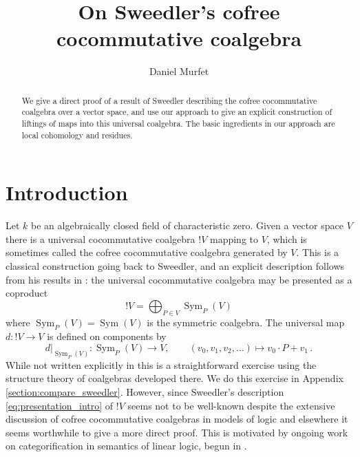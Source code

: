 \documentclass[english,letter paper,12pt,reqno]{article}
\theoremstyle{example}
\numberwithin{equation}{section}
\def\res{\operatorname{Res}}
\DeclareMathOperator{\Sym}{Sym}
\begin{document}
\def\ScoreOverhang{1pt}

\def\Res{\res\!}
\newcommand{\ud}[1]{\operatorname{d}\!{#1}}
\newcommand{\Ress}[1]{\res_{#1}\!}
\newcommand{\cat}[1]{\mathcal{#1}}
\newcommand{\lto}{\longrightarrow}
\newcommand{\xlto}[1]{\stackrel{#1}\lto}
\newcommand{\mf}[1]{\mathfrak{#1}}
\newcommand{\md}[1]{\mathscr{#1}}
\newcommand{\church}[1]{\underline{#1}}
\newcommand{\prf}[1]{\underline{#1}}
\newcommand{\den}[1]{\llbracket #1 \rrbracket}
\def\l{\,|\,}
\def\sgn{\textup{sgn}}
\def\cont{\operatorname{cont}}

\title{On Sweedler's cofree cocommutative coalgebra}
\author{Daniel Murfet}

\maketitle

\begin{abstract} We give a direct proof of a result of Sweedler describing the cofree cocommutative coalgebra over a vector space, and use our approach to give an explicit construction of liftings of maps into this universal coalgebra. The basic ingredients in our approach are local cohomology and residues.
\end{abstract}

\section{Introduction}

Let $k$ be an algebraically closed field of characteristic zero. Given a vector space $V$ there is a universal cocommutative coalgebra ${!}V$ mapping to $V$, which is sometimes called the cofree cocommutative coalgebra generated by $V$. This is a classical construction going back to Sweedler, and an explicit description follows from his results in \cite{sweedler}: the universal cocommutative coalgebra may be presented as a coproduct
\begin{equation}\label{eq:presentation_intro}
{!} V = \bigoplus_{P \in V} \Sym_P(V)
\end{equation}
where $\Sym_P(V) = \Sym(V)$ is the symmetric coalgebra. The universal map $d: {!} V \lto V$ is defined on components by
\[
d|_{\Sym_P(V)}: \Sym_P(V) \lto V, \qquad (v_0,v_1,v_2,\ldots) \longmapsto v_0 \cdot P + v_1\,.
\]
While not written explicitly in \cite{sweedler} this is a straightforward exercise using the structure theory of coalgebras developed there. We do this exercise in Appendix \ref{section:compare_sweedler}. However, since Sweedler's description \eqref{eq:presentation_intro} of ${!} V$ seems not to be well-known despite the extensive discussion of cofree cocommutative coalgebras in models of logic \cite{blute,hyland,mellies2,schreiber} and elsewhere it seems worthwhile to give a more direct proof. This is motivated by ongoing work on categorification in semantics of linear logic, begun in \cite{murfet}.
\end{document}

